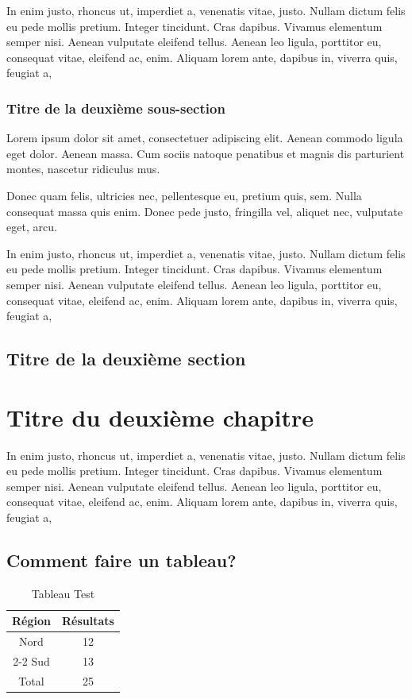 \documentclass[a4paper,12pt]{report}
\begin{document}
In enim justo, rhoncus ut, imperdiet a, venenatis vitae, justo.
Nullam dictum felis eu pede mollis pretium. Integer tincidunt. Cras
dapibus. Vivamus elementum semper nisi. Aenean vulputate eleifend
tellus. Aenean leo ligula, porttitor eu, consequat vitae, eleifend
ac, enim. Aliquam lorem ante, dapibus in, viverra quis, feugiat a,

\subsection{Titre de la deuxième sous-section}

Lorem ipsum dolor sit amet, consectetuer adipiscing elit. Aenean
commodo ligula eget dolor. Aenean massa. Cum sociis natoque
penatibus et magnis dis parturient montes, nascetur ridiculus mus.

Donec quam felis, ultricies nec, pellentesque eu, pretium quis, sem.
Nulla consequat massa quis enim. Donec pede justo, fringilla vel,
aliquet nec, vulputate eget, arcu.

In enim justo, rhoncus ut, imperdiet a, venenatis vitae, justo.
Nullam dictum felis eu pede mollis pretium. Integer tincidunt. Cras
dapibus. Vivamus elementum semper nisi. Aenean vulputate eleifend
tellus. Aenean leo ligula, porttitor eu, consequat vitae, eleifend
ac, enim. Aliquam lorem ante, dapibus in, viverra quis, feugiat
a,%


\section{Titre de la deuxième section}



\chapter {Titre du deuxième chapitre}
\thispagestyle {empty} In enim justo, rhoncus ut, imperdiet a,
venenatis vitae, justo. Nullam dictum felis eu pede mollis pretium.
Integer tincidunt. Cras dapibus. Vivamus elementum semper nisi.
Aenean vulputate eleifend tellus. Aenean leo ligula, porttitor eu,
consequat vitae, eleifend ac, enim. Aliquam lorem ante, dapibus in,
viverra quis, feugiat a,%

\section {Comment faire un tableau?}

\begin{table}[!h]
    \renewcommand{\tablename}{Tab}
    \centering
    \smallskip
    \begin{tabular}{|c|c|}
        \hline
            Région & Résultats \\
        \hline \hline
            Nord & 12 \\
        \cline{2-2}
            Sud & 13 \\
        \hline
            Total & 25 \\
        \hline
    \end{tabular}
    \caption{Tableau Test\label{Tab1}}
\end{table}
\end{document}

